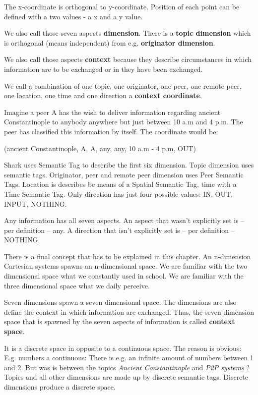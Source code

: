 The x-coordinate is orthogonal to y-coordinate. Position of each point can be defined with a two values - a x and a y value. 

We also call those seven aspects {\bf dimension}. There is a {\bf topic dimension} which is orthogonal (means independent) from e.g. {\bf originator dimension}.

We also call those aspects {\bf context} because they describe circumstances in which information are to be exchanged or in they have been exchanged.

We call a combination of one topic, one originator, one peer, one remote peer, one location, one time and one direction a {\bf context coordinate}. 

Imagine a peer A has the wish to deliver information regarding ancient Constantinople to anybody anywhere but just between 10 a.m and 4 p.m. The peer has classified this information by itself. The coordinate would be:

(ancient Constantinople, A, A, any, any, 10 a.m - 4 p.m, OUT)

Shark uses Semantic Tag to describe the first six dimension. Topic dimension uses semantic tags. Originator, peer and remote peer dimension uses Peer Semantic Tags. Location is describes be means of a Spatial Semantic Tag, time with a Time Semantic Tag. Only direction has just four possible values: IN, OUT, INPUT, NOTHING.

Any information has all seven aspects. An aspect that wasn't explicitly set is -- per definition -- any. A direction that isn't explicitly set is -- per definition -- NOTHING.

There is a final concept that has to be explained in this chapter.
An n-dimension Cartesian systems spawns an n-dimensional space.
We are familiar with the two dimensional space what we constantly used in school. We are familiar with the three dimensional space what we daily perceive.

Seven dimensions spawn a seven dimensional space. The dimensions are also define the context in which information are exchanged. Thus, the seven dimension space that is spawned by the seven aspects of information is called {\bf context space}.

It is a discrete space in opposite to a continuous space. The reason is obvious: E.g. numbers a continuous: There is e.g. an infinite amount of numbers between 1 and 2. But was is between the topics {\it Ancient Constantinople} and {\it P2P systems} ? Topics and all other dimensions are made up by discrete semantic tags. Discrete dimensions produce a discrete space.

